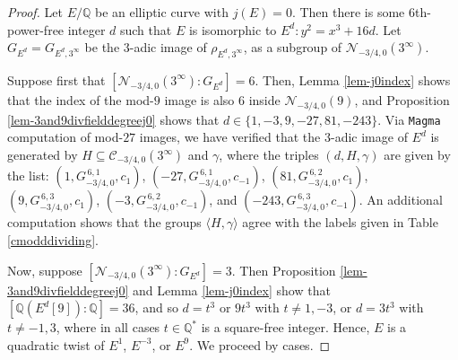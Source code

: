 \documentclass[11pt]{amsart}
\theoremstyle{definition}
\newcommand{\Q}{\mathbb Q}
\begin{document}
\begin{proof}
    Let $E/\Q$ be an elliptic curve with $j(E) = 0$. Then there is some $6$th-power-free integer $d$ such that $E$ is isomorphic to $E^d : y^2 = x^3 + 16d$. Let $G_{E^d} = G_{E^d,3^\infty}$ be the $3$-adic image of $\rho_{E^d, 3^{\infty}}$, as a subgroup of $\mathcal{N}_{-3/4, 0}(3^{\infty})$.

    Suppose first that $[\mathcal{N}_{-3/4, 0}(3^{\infty}) : G_{E^d}] = 6$. Then, Lemma \ref{lem-j0index} shows that the index of the mod-$9$ image is also $6$ inside $\mathcal{N}_{-3/4,0}(9)$, and Proposition \ref{lem-3and9divfielddegreej0} shows that $d \in \{1, -3, 9, -27, 81, -243 \}$. Via \verb|Magma| computation of mod-$27$ images, we have verified that the $3$-adic image of $E^d$ is generated by $H \subseteq \mathcal{C}_{-3/4, 0}(3^{\infty})$ and $\gamma$, where the triples $(d, H, \gamma)$ are given by the list: $(1, G^{\, 6, 1}_{-3/4, 0}, c_{1})$, $(-27, G^{\, 6, 1}_{-3/4, 0}, c_{-1})$, $(81, G^{\, 6, 2}_{-3/4, 0}, c_{1})$, $(9, G^{\, 6, 3}_{-3/4, 0}, c_{1})$, $(-3, G^{\, 6, 2}_{-3/4, 0}, c_{-1})$, and $(-243, G^{\, 6, 3}_{-3/4, 0}, c_{-1})$. An additional computation shows that the groups $\langle H, \gamma \rangle$ agree with the labels given in Table \ref{cmodddividing}.

    Now, suppose $[\mathcal{N}_{-3/4, 0}(3^{\infty}) : G_{E^d}] = 3$. Then Proposition \ref{lem-3and9divfielddegreej0} and Lemma \ref{lem-j0index} show that $[\Q(E^d[9]) : \Q] = 36$, and so $d = t^3$ or $9t^3$ with $t \neq 1, -3$, or $d = 3t^3$ with $t \neq -1, 3$, where in all cases $t \in \Q^{\ast}$ is a square-free integer. Hence, $E$ is a quadratic twist of $E^1$, $E^{-3}$, or $E^9$. We proceed by cases.


\end{proof}
\end{document}
